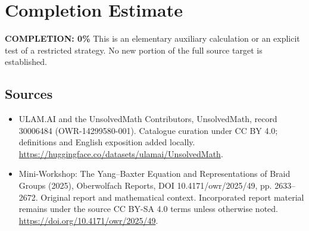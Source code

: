 \documentclass[11pt]{article}
\begin{document}
\section{Completion Estimate}
\noindent\textbf{COMPLETION: 0\%}
This is an elementary auxiliary calculation or an explicit test of a restricted strategy. No new portion of the full source target is established.

\subsection{Sources}
\begin{itemize}
\item[\hypertarget{source:30006484:1}{S1}] ULAM.AI and the UnsolvedMath Contributors, UnsolvedMath, record 30006484 (OWR-14299580-001). Catalogue curation under CC BY 4.0; definitions and English exposition added locally.
\url{https://huggingface.co/datasets/ulamai/UnsolvedMath}.
\item[\hypertarget{source:30006484:2}{S2}] Mini-Workshop: The Yang–Baxter Equation and Representations of Braid Groups (2025), Oberwolfach Reports, DOI 10.4171/owr/2025/49, pp. 2633--2672. Original report and mathematical context. Incorporated report material remains under the source CC BY-SA 4.0 terms unless otherwise noted.
\url{https://doi.org/10.4171/owr/2025/49}.
\end{itemize}
\label{end:30006484}
\end{document}
